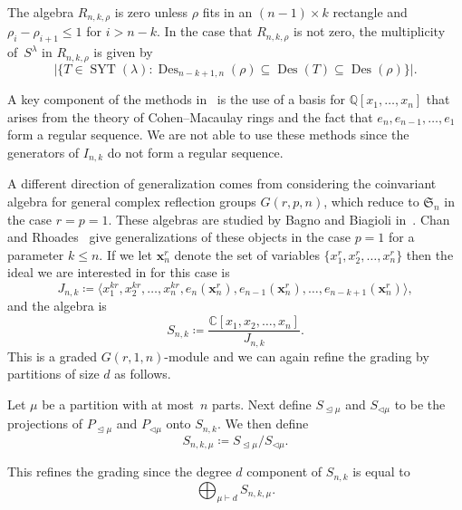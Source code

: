 \documentclass[ALCO,ThmDefs,Unicode,epreuves]{cedram}
\DeclareMathOperator{\Des}{Des}
\DeclareMathOperator{\SYT}{SYT}
\begin{document}
\begin{thm}
\label{Result1}
	The algebra $R_{n,k,\rho}$ is zero unless $\rho$ fits in an $(n-1)\times k$ rectangle and $\rho_i-\rho_{i+1}\leq 1$ for 
$i>n-k$. In the case that $R_{n,k,\rho}$ is not zero, the multiplicity of~$S^\lambda$ in $R_{n,k,\rho}$ is given by 
\begin{equation}
\vert \{T\in \SYT (\lambda): \Des _{n-k+1,n}(\rho)\subseteq \Des(T)\subseteq \Des(\rho) \}\vert.
\end{equation}
\end{thm} 

A key component of the methods in~\cite{ABR} is the use of a basis for $\mathbb{Q}[x_1,\ldots, x_n]$ that arises from the 
theory of Cohen--Macaulay rings and the fact that $e_n, e_{n-1},\ldots, e_1$ form a regular sequence. We are not able to use 
these methods since the generators of $I_{n,k}$ do not form a regular sequence. 



A different direction of generalization comes from considering the coinvariant algebra for general complex reflection groups 
$G(r,p,n)$, which reduce to $\mathfrak{S}_n$ in the case $r=p=1$. These algebras are studied by Bagno and Biagioli in~\cite{BB}. Chan and Rhoades~\cite{CR} give generalizations of these objects in the case $p=1$ for a parameter $k\leq n$. If 
we let $\mathbf{x}_n^r$ denote the set of variables $\{x_1^r,x_2^r,\ldots, x_n^r\}$ then the ideal we are interested in for 
this case is 
\begin{equation}
J_{n,k}\coloneqq \langle x_1^{kr},x_2^{kr},\ldots, x_n^{kr}, 
e_n(\mathbf{x}_n^r),e_{n-1}(\mathbf{x}_n^r),\ldots, e_{n-k+1}(\mathbf{x}_n^r)\rangle,
\end{equation}
 and the algebra is 
		\begin{equation}
S_{n,k}\coloneqq \frac{\mathbb{C}[x_1,x_2,\ldots, x_n]}{J_{n,k}}.
\end{equation}
 This is a graded $G(r,1,n)$-module and we can again refine the grading by partitions of size $d$ as follows.
\begin{defi}

	Let $\mu$ be a partition with at most~$n$ parts. Next define $S_{\trianglelefteq\mu}$ and $S_{\triangleleft\mu}$ to be 
the projections of $P_{\trianglelefteq\mu}$ and $P_{\triangleleft\mu}$ onto $S_{n,k}$. We then define 
		\begin{equation}S_{n,k,\mu}\coloneqq S_{\trianglelefteq\mu}/S_{\triangleleft\mu}.
\end{equation}
\end{defi}
	This refines the grading since the degree $d$ component of $S_{n,k}$ is equal to 
		\begin{equation}
\bigoplus_{\mu\vdash d} S_{n,k,\mu}.
\end{equation}
\end{document}

